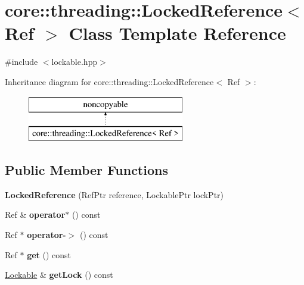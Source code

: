 \hypertarget{classcore_1_1threading_1_1_locked_reference}{\section{core\-:\-:threading\-:\-:Locked\-Reference$<$ Ref $>$ Class Template Reference}
\label{classcore_1_1threading_1_1_locked_reference}
}


{\ttfamily \#include $<$lockable.\-hpp$>$}

Inheritance diagram for core\-:\-:threading\-:\-:Locked\-Reference$<$ Ref $>$\-:\begin{figure}[H]
\begin{center}
\leavevmode
\includegraphics[height=2.000000cm]{classcore_1_1threading_1_1_locked_reference}
\end{center}
\end{figure}
\subsection*{Public Member Functions}
\begin{DoxyCompactItemize}
\item 
\hypertarget{classcore_1_1threading_1_1_locked_reference_a7a905004247d0a660eb0840686c88a64}{{\bfseries Locked\-Reference} (Ref\-Ptr reference, Lockable\-Ptr lock\-Ptr)}\label{classcore_1_1threading_1_1_locked_reference_a7a905004247d0a660eb0840686c88a64}

\item 
\hypertarget{classcore_1_1threading_1_1_locked_reference_a95b0284049c932adf0cc200bef167240}{Ref \& {\bfseries operator$\ast$} () const }\label{classcore_1_1threading_1_1_locked_reference_a95b0284049c932adf0cc200bef167240}

\item 
\hypertarget{classcore_1_1threading_1_1_locked_reference_af9acbbabce9cc51bb8c9f309303ed803}{Ref $\ast$ {\bfseries operator-\/$>$} () const }\label{classcore_1_1threading_1_1_locked_reference_af9acbbabce9cc51bb8c9f309303ed803}

\item 
\hypertarget{classcore_1_1threading_1_1_locked_reference_aa15b8bd1893c6cfbaee2d6e4c1effd00}{Ref $\ast$ {\bfseries get} () const }\label{classcore_1_1threading_1_1_locked_reference_aa15b8bd1893c6cfbaee2d6e4c1effd00}

\item 
\hypertarget{classcore_1_1threading_1_1_locked_reference_af078fe9a05bbe506d76b212d6e301efd}{\hyperlink{classcore_1_1threading_1_1_lockable}{Lockable} \& {\bfseries get\-Lock} () const }\label{classcore_1_1threading_1_1_locked_reference_af078fe9a05bbe506d76b212d6e301efd}

\end{DoxyCompactItemize}
